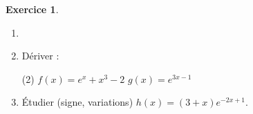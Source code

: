\documentclass{article}
\theoremstyle{definition}
\newtheorem{exercice}{Exercice}
\begin{document}
\vfill

\begin{exercice}
  \begin{enumerate}
    \item[]
    \item Dériver :
    \begin{tasks}(2)
      \task $f(x)=e^{x}+x^3-2$
      \task $g(x)=e^{3x-1}$
    \end{tasks}
    \item Étudier (signe, variations) $h(x)=(3+x)e^{-2x+1}$.
  \end{enumerate}
\end{exercice}

% 
% 
% 
% 
% 
% 
% 

\newpage 
\end{document}
